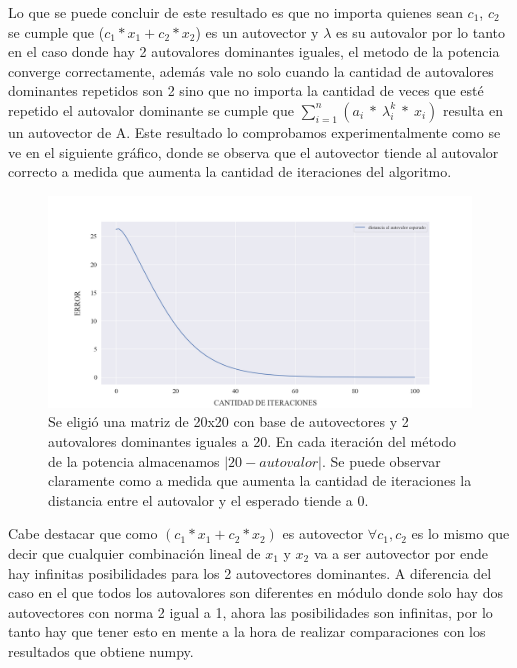 Lo que se puede concluir de este resultado es que no importa quienes sean $c_1$, $c_2$ se cumple que ($c_1 * x_1 + c_2 * x_2$) es un autovector y $\lambda$ es su autovalor por lo tanto en el caso donde hay 2 autovalores dominantes iguales, el metodo de la potencia converge correctamente, además vale no solo cuando la cantidad de autovalores dominantes repetidos son 2 sino que no importa la cantidad de veces que esté repetido el autovalor dominante se cumple que $\sum_{i=1}^{n} (a_i \ * \ \lambda_{i}^{k} \ * \ x_i)$ resulta en un autovector de A.
Este resultado lo comprobamos experimentalmente como se ve en el siguiente gráfico, donde se observa que el autovector tiende al autovalor correcto a medida que aumenta la cantidad de iteraciones del algoritmo.


\vspace{1em}
\begin{figure}[!htbp]
\includegraphics[scale=0.45]{files/src/.media/op_autovalor_repetidol.png}
\caption{Se eligió una matriz de 20x20 con base de autovectores y 2 autovalores dominantes iguales a 20. En cada iteración del método de la potencia almacenamos $|20 - autovalor|$. Se puede observar claramente como a medida que aumenta la cantidad de iteraciones la distancia entre el autovalor y el esperado tiende a 0.}
\end{figure}

Cabe destacar que como $(c_1 * x_1 + c_2 * x_2)$ es autovector $\forall c_1, c_2$ es lo mismo que decir que cualquier combinación lineal de $x_1$ y $x_2$ va a ser autovector por ende hay infinitas posibilidades para los 2 autovectores dominantes. A diferencia del caso en el que todos los autovalores son diferentes en módulo donde solo hay dos autovectores con norma 2 igual a 1, ahora las posibilidades son infinitas, por lo tanto hay que tener esto en mente a la hora de realizar comparaciones con los resultados que obtiene numpy. 

